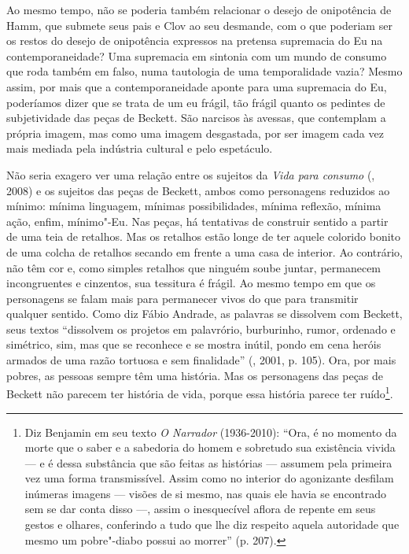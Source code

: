 Ao mesmo tempo, não se poderia também relacionar o desejo de onipotência
de Hamm, que submete seus pais e Clov ao seu desmande, com o que
poderiam ser os restos do desejo de onipotência expressos na pretensa
supremacia do Eu na contemporaneidade? Uma supremacia em sintonia com um
mundo de consumo que roda também em falso, numa tautologia de uma
temporalidade vazia? Mesmo assim, por mais que a contemporaneidade
aponte para uma supremacia do Eu, poderíamos dizer que se trata de um eu
frágil, tão frágil quanto os pedintes de subjetividade das peças de
Beckett. São narcisos às avessas, que contemplam a própria imagem, mas
como uma imagem desgastada, por ser imagem cada vez mais mediada pela
indústria cultural e pelo espetáculo.

Não seria exagero ver uma relação entre os sujeitos da \emph{Vida para
consumo} (, 2008) e os sujeitos das peças de Beckett, ambos como
personagens reduzidos ao mínimo: mínima linguagem, mínimas
possibilidades, mínima reflexão, mínima ação, enfim, mínimo"-Eu. Nas
peças, há tentativas de construir sentido a partir de uma teia de
retalhos. Mas os retalhos estão longe de ter aquele colorido bonito de
uma colcha de retalhos secando em frente a uma casa de interior. Ao
contrário, não têm cor e, como simples retalhos que ninguém soube
juntar, permanecem incongruentes e cinzentos, sua tessitura é frágil. Ao
mesmo tempo em que os personagens se falam mais para permanecer vivos do
que para transmitir qualquer sentido. Como diz Fábio Andrade, as
palavras se dissolvem com Beckett, seus textos ``dissolvem os projetos
em palavrório, burburinho, rumor, ordenado e simétrico, sim, mas que se
reconhece e se mostra inútil, pondo em cena heróis armados de uma razão
tortuosa e sem finalidade'' (, 2001, p. 105). Ora, por mais
pobres, as pessoas sempre têm uma história. Mas os personagens das peças
de Beckett não parecem ter história de vida, porque essa história parece
ter ruído\footnote{Diz Benjamin em seu texto \emph{O Narrador}
  (1936-2010): ``Ora, é no momento da morte que o saber e a sabedoria do
  homem e sobretudo sua existência vivida --- e é dessa substância que
  são feitas as histórias --- assumem pela primeira vez uma forma
  transmissível. Assim como no interior do agonizante desfilam inúmeras
  imagens --- visões de si mesmo, nas quais ele havia se encontrado sem
  se dar conta disso ---, assim o inesquecível aflora de repente em seus
  gestos e olhares, conferindo a tudo que lhe diz respeito aquela
  autoridade que mesmo um pobre"-diabo possui ao morrer'' (p. 207).}.

